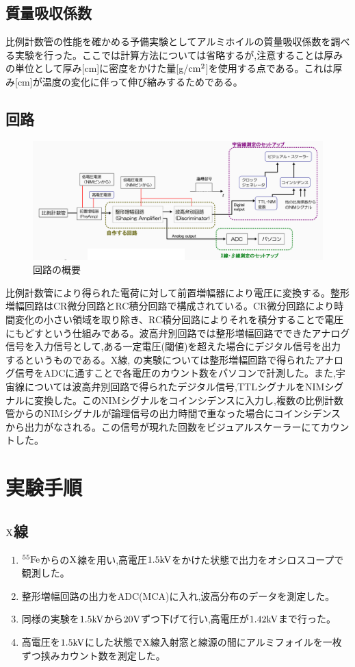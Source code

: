 \documentclass[a4j]{jsarticle}
\begin{document}
	
	\subsection{質量吸収係数}
	比例計数管の性能を確かめる予備実験としてアルミホイルの質量吸収係数を調べる実験を行った。ここでは計算方法については省略するが,注意することは厚みの単位として厚み[cm]に密度をかけた量[g/$\rm{cm^2}$]を使用する点である。これは厚み[cm]が温度の変化に伴って伸び縮みするためである。
	
	\subsection{回路}
	\begin{figure}[htbp]
	\centering
	\includegraphics[width=12cm]{aboutcircuit.png}
	\caption{回路の概要}
	\end{figure}
	比例計数管により得られた電荷に対して前置増幅器により電圧に変換する。整形増幅回路はCR微分回路とRC積分回路で構成されている。CR微分回路により時間変化の小さい領域を取り除き、RC積分回路によりそれを積分することで電圧にもどすという仕組みである。波高弁別回路では整形増幅回路でできたアナログ信号を入力信号として,ある一定電圧(閾値)を超えた場合にデジタル信号を出力するというものである。X線, の実験については整形増幅回路で得られたアナログ信号をADCに通すことで各電圧のカウント数をパソコンで計測した。また,宇宙線については波高弁別回路で得られたデジタル信号,TTLシグナルをNIMシグナルに変換した。このNIMシグナルをコインシデンスに入力し,複数の比例計数管からのNIMシグナルが論理信号の出力時間で重なった場合にコインシデンスから出力がなされる。この信号が現れた回数をビジュアルスケーラーにてカウントした。
	
\section{実験手順}
	\subsection{$\rm{X}$線}
	\begin{enumerate}
	\item $\rm{^{55}Fe}$からの$\rm{X}$線を用い,高電圧$1.5\rm{kV}$をかけた状態で出力をオシロスコープで観測した。
	\item 整形増幅回路の出力をADC(MCA)に入れ,波高分布のデータを測定した。
	\item 同様の実験を$1.5\rm{kV}$から$20\rm{V}$ずつ下げて行い,高電圧が$1.42\rm{kV}$まで行った。
	\item 高電圧を$1.5\rm{kV}$にした状態で$\rm{X}$線入射窓と線源の間にアルミフォイルを一枚ずつ挟みカウント数を測定した。
	\end{enumerate}
		
\end{document}
